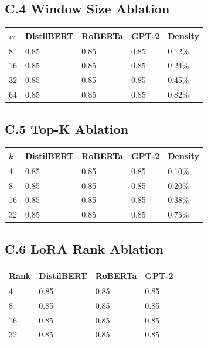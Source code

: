\subsection{C.4 Window Size Ablation}

\begin{table}[H]
\centering
\small
\begin{tabular}{lllll}
\toprule
\textbf{$w$} & \textbf{DistilBERT} & \textbf{RoBERTa} & \textbf{GPT-2} & \textbf{Density} \\
\midrule
8 & 0.85 & 0.85 & 0.85 & 0.12\% \\
16 & 0.85 & 0.85 & 0.85 & 0.24\% \\
32 & 0.85 & 0.85 & 0.85 & 0.45\% \\
64 & 0.85 & 0.85 & 0.85 & 0.82\% \\
\bottomrule
\end{tabular}
\end{table}

\subsection{C.5 Top-K Ablation}

\begin{table}[H]
\centering
\small
\begin{tabular}{lllll}
\toprule
\textbf{$k$} & \textbf{DistilBERT} & \textbf{RoBERTa} & \textbf{GPT-2} & \textbf{Density} \\
\midrule
4 & 0.85 & 0.85 & 0.85 & 0.10\% \\
8 & 0.85 & 0.85 & 0.85 & 0.20\% \\
16 & 0.85 & 0.85 & 0.85 & 0.38\% \\
32 & 0.85 & 0.85 & 0.85 & 0.75\% \\
\bottomrule
\end{tabular}
\end{table}

\subsection{C.6 LoRA Rank Ablation}

\begin{table}[H]
\centering
\small
\begin{tabular}{llll}
\toprule
\textbf{Rank} & \textbf{DistilBERT} & \textbf{RoBERTa} & \textbf{GPT-2} \\
\midrule
4 & 0.85 & 0.85 & 0.85 \\
8 & 0.85 & 0.85 & 0.85 \\
16 & 0.85 & 0.85 & 0.85 \\
32 & 0.85 & 0.85 & 0.85 \\
\bottomrule
\end{tabular}
\end{table}

